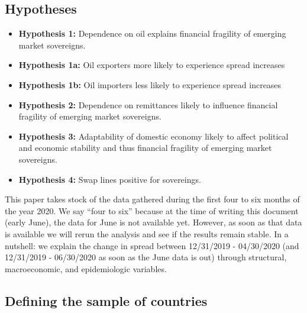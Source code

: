 \documentclass[11pt,]{article}
\providecommand{\tightlist}{%
\setlength{\itemsep}{0pt}\setlength{\parskip}{0pt}}
\begin{document}
\hypertarget{hypotheses}{%
\subsection{Hypotheses}\label{hypotheses}}

\begin{itemize}
\tightlist
\item
  \textbf{Hypothesis 1:} Dependence on oil explains financial fragility
  of emerging market sovereigns.
\item
  \textbf{Hypothesis 1a:} Oil exporters more likely to experience spread
  increases
\item
  \textbf{Hypothesis 1b:} Oil importers less likely to experience spread
  increases
\item
  \textbf{Hypothesis 2:} Dependence on remittances likely to influence
  financial fragility of emerging market sovereigns.
\item
  \textbf{Hypothesis 3:} Adaptability of domestic economy likely to
  affect political and economic stability and thus financial fragility
  of emerging market sovereigns.
\item
  \textbf{Hypothesis 4:} Swap lines positive for sovereings.
\end{itemize}

This paper takes stock of the data gathered during the first four to six
months of the year 2020. We say ``four to six'' because at the time of
writing this document (early June), the data for June is not available
yet. However, as soon as that data is available we will rerun the
analysis and see if the results remain stable. In a nutshell: we explain
the change in spread between 12/31/2019 - 04/30/2020 (and 12/31/2019 -
06/30/2020 as soon as the June data is out) through structural,
macroeconomic, and epidemiologic variables.

\hypertarget{defining-the-sample-of-countries}{%
\subsection{Defining the sample of
countries}\label{defining-the-sample-of-countries}}
\end{document}
